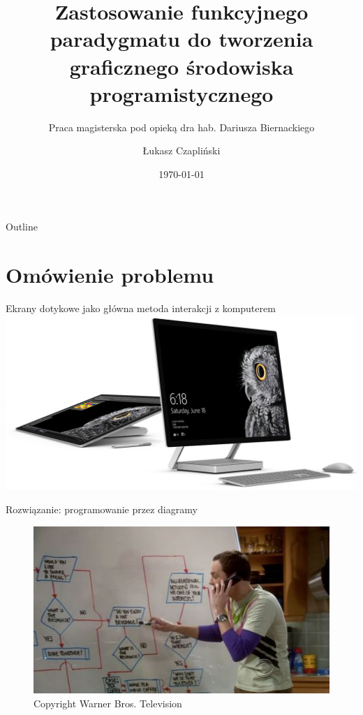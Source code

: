 \documentclass[presentation]{beamer}
\institute{Wydział Matematyki i Informatyki UWr}\subtitle{Praca magisterska pod opieką dra hab. Dariusza Biernackiego}
\author{Łukasz Czapliński}
\date{\today}
\title{Zastosowanie funkcyjnego paradygmatu do tworzenia graficznego środowiska programistycznego}
\begin{document}
\maketitle
\begin{frame}{Outline}
\tableofcontents
\end{frame}

\section{Omówienie problemu}
\label{sec-1}
\begin{frame}[label=sec-1-1]{Ekrany dotykowe jako główna metoda interakcji z komputerem}
\includegraphics[width=.9\linewidth]{./img/studio.png}
\end{frame}
\begin{frame}[label=sec-1-2]{Rozwiązanie: programowanie przez diagramy}
\begin{figure}[htb]
\centering
\includegraphics[width=.9\linewidth]{./img/whiteboard.jpg}
\caption{\small{Copyright Warner Bros. Television}}
\end{figure}
\end{frame}
\end{document}
